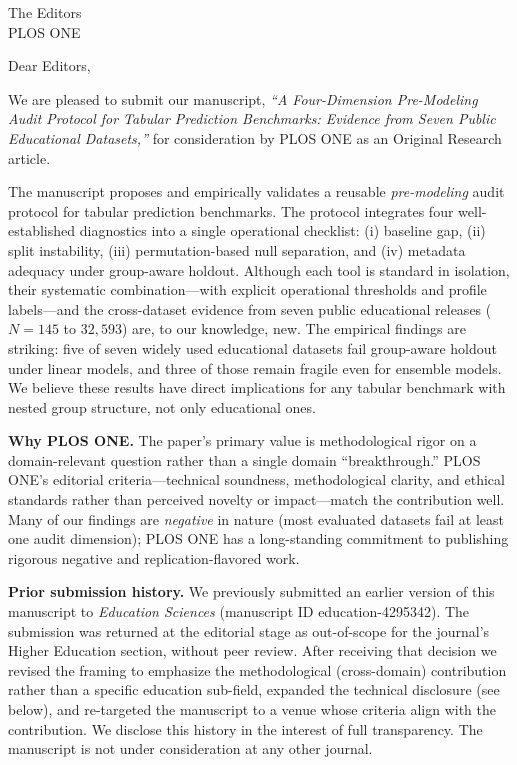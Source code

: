 \documentclass[11pt]{letter}
\begin{document}
\begin{letter}{The Editors\\PLOS ONE}

\opening{Dear Editors,}

We are pleased to submit our manuscript, \textit{``A Four-Dimension
Pre-Modeling Audit Protocol for Tabular Prediction Benchmarks: Evidence
from Seven Public Educational Datasets,''} for consideration by PLOS ONE
as an Original Research article.

The manuscript proposes and empirically validates a reusable
\textit{pre-modeling} audit protocol for tabular prediction benchmarks.
The protocol integrates four well-established diagnostics into a single
operational checklist: (i) baseline gap, (ii) split instability,
(iii) permutation-based null separation, and (iv) metadata adequacy
under group-aware holdout. Although each tool is standard in isolation,
their systematic combination---with explicit operational thresholds and
profile labels---and the cross-dataset evidence from seven public
educational releases ($N = 145$ to $32{,}593$) are, to our knowledge, new.
The empirical findings are striking: five of seven widely used educational
datasets fail group-aware holdout under linear models, and three of those
remain fragile even for ensemble models. We believe these results have
direct implications for any tabular benchmark with nested group structure,
not only educational ones.

\textbf{Why PLOS ONE.} The paper's primary value is methodological rigor
on a domain-relevant question rather than a single domain
``breakthrough.'' PLOS ONE's editorial criteria---technical soundness,
methodological clarity, and ethical standards rather than perceived
novelty or impact---match the contribution well. Many of our findings are
\textit{negative} in nature (most evaluated datasets fail at least one
audit dimension); PLOS ONE has a long-standing commitment to publishing
rigorous negative and replication-flavored work.

\textbf{Prior submission history.} We previously submitted an earlier
version of this manuscript to \textit{Education Sciences} (manuscript ID
education-4295342). The submission was returned at the editorial stage as
out-of-scope for the journal's Higher Education section, without
peer review. After receiving that decision we revised the framing to
emphasize the methodological (cross-domain) contribution rather than a
specific education sub-field, expanded the technical disclosure
(see below), and re-targeted the manuscript to a venue whose criteria
align with the contribution. We disclose this history in the interest of
full transparency. The manuscript is not under consideration at any other
journal.


\end{letter}
\end{document}
